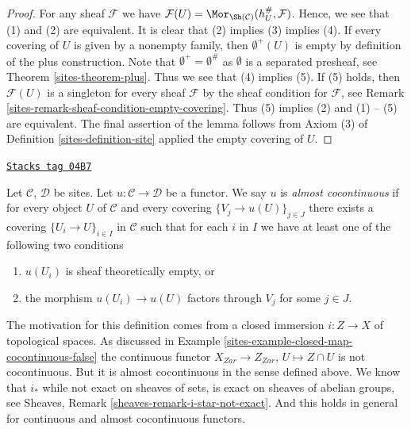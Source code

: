\begin{proof}

For any sheaf $\mathcal{F}$ we have
$\mathcal{F}(U) = \Mor_{\Sh(\mathcal{C})}(h_U^\#, \mathcal{F})$.
Hence, we see that (1) and (2) are equivalent.
It is clear that (2) implies (3) implies (4).
If every covering of $U$ is given by a nonempty family,
then $\emptyset^+(U)$ is empty by definition of the plus construction.
Note that $\emptyset^+ = \emptyset^\#$ as $\emptyset$ is a separated
presheaf, see
Theorem \ref{sites-theorem-plus}.
Thus we see that (4) implies (5). If (5) holds, then
$\mathcal{F}(U)$ is a singleton for every sheaf $\mathcal{F}$
by the sheaf condition for $\mathcal{F}$, see
Remark \ref{sites-remark-sheaf-condition-empty-covering}.
Thus (5) implies (2) and (1) -- (5) are equivalent. The final
assertion of the lemma follows from Axiom (3) of
Definition \ref{sites-definition-site}
applied the empty covering of $U$.
\end{proof}

\begin{definition}
\label{sites-definition-almost-cocontinuous}
\href{https://stacks.math.columbia.edu/tag/04B7}{\texttt{Stacks tag 04B7}}

Let $\mathcal{C}$, $\mathcal{D}$ be sites.
Let $u : \mathcal{C} \to \mathcal{D}$ be a functor.
We say $u$ is {\it almost cocontinuous} if for every
object $U$ of $\mathcal{C}$ and every covering
$\{V_j \to u(U)\}_{j \in J}$ there exists a covering
$\{U_i \to U\}_{i \in I}$ in $\mathcal{C}$ such that
for each $i$ in $I$ we have at least one of the following two conditions
\begin{enumerate}
\item $u(U_i)$ is sheaf theoretically empty, or
\item the morphism $u(U_i) \to u(U)$ factors through $V_j$ for some $j \in J$.
\end{enumerate}
\end{definition}

The motivation for this definition comes from a closed immersion
$i : Z \to X$ of topological spaces. As discussed in
Example \ref{sites-example-closed-map-cocontinuous-false}
the continuous functor
$X_{Zar} \to Z_{Zar}$, $U \mapsto Z \cap U$ is
not cocontinuous. But it is almost cocontinuous in the sense defined above.
We know that $i_*$ while not exact on sheaves of sets, is
exact on sheaves of abelian groups, see
Sheaves, Remark \ref{sheaves-remark-i-star-not-exact}.
And this holds in general for continuous and almost cocontinuous functors.

